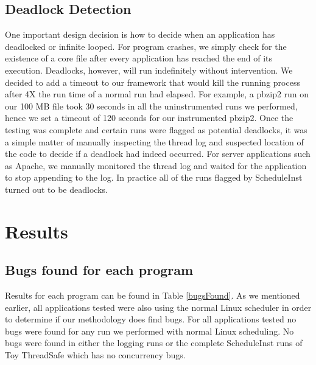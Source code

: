 \documentclass[10pt,]{article} %
\begin{document}
\subsection{Deadlock Detection}

One important design decision is how to decide when an application has deadlocked or infinite looped.  For program crashes, we simply check for the existence of a core file after every application has reached the end of its execution. Deadlocks, however, will run indefinitely without intervention. We decided to add a timeout to our framework that would kill the running process after 4X the run time of a normal run had elapsed. For example, a pbzip2 run on our 100 MB file took 30 seconds in all the uninstrumented runs we performed, hence we set a timeout of 120 seconds for our instrumented pbzip2.  Once the testing was complete and certain runs were flagged as potential deadlocks, it was a simple matter of manually inspecting the thread log and suspected location of the code to decide if a deadlock had indeed occurred. For server applications such as Apache, we manually monitored the thread log and waited for the application to stop appending to the log. In practice all of the runs flagged by ScheduleInst turned out to be deadlocks. 



\section{Results}


\subsection{Bugs found for each program}
Results for each program can be found in Table \ref{bugsFound}.  As we mentioned earlier, all applications tested were also using the normal Linux scheduler in order to determine if our methodology does find bugs. For all applications tested no bugs were found for any run we performed with normal Linux scheduling. No bugs were found in either the logging runs or the complete ScheduleInst runs of Toy ThreadSafe which has no concurrency bugs.  
\end{document}
